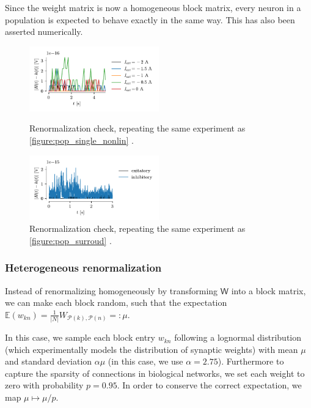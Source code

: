 \documentclass[10pt,conference,compsocconf,a4paper]{IEEEtran}
\newcommand*{\shortautoref}[1]{%
	\begingroup
	\def\equationautorefname{\textsc{Eq.}}%
	\def\tableautorefname{\textsc{Tab.}}%
	\def\figureautorefname{\textsc{Fig.}}%
	\autoref{#1}%
	\endgroup
}
\begin{document}
			Since the weight matrix is now a homogeneous block matrix, every neuron in a population is expected to behave exactly in the same way. This has also been asserted numerically.

			\begin{figure}
				\centering
				\includegraphics[width=0.5\textwidth]{figures/pop_renorm_single.pdf}
				\caption{Renormalization check, repeating the same experiment as \shortautoref{figure:pop_single_nonlin}.}
				\label{figure:pop_renorm_single}
				\centering
				\includegraphics[width=0.5\textwidth]{figures/pop_renorm_ei.pdf}
				\caption{Renormalization check, repeating the same experiment as \shortautoref{figure:pop_surroud}.}
				\label{figure:pop_renorm_ei}
			\end{figure}

		\subsubsection{Heterogeneous renormalization}

			Instead of renormalizing homogeneously by transforming $\mathsf W$ into a block matrix, we can make each block random, such that the expectation $\mathbb E(w_{kn}) = \frac{1}{|N|} W_{\mathcal P(k),\mathcal P(n)} =: \mu$.
			
			In this case, we sample each block entry $w_{kn}$ following a lognormal distribution (which experimentally models the distribution of synaptic weights) with mean $\mu$ and standard deviation $\alpha \mu$ (in this case, we use $\alpha = 2.75$).
			Furthermore to capture the sparsity of connections in biological networks, we set each weight to zero with probability $p=0.95$. In order to conserve the correct expectation, we map $\mu \mapsto \mu/p$.
\end{document}
